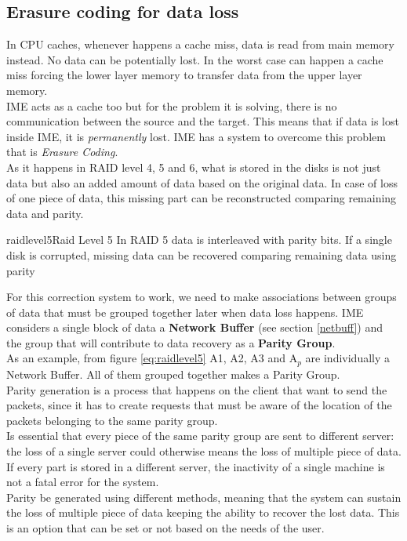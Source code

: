 \subsection{Erasure coding for data loss} \label{pargroup}
In CPU caches, whenever happens a cache miss, data is read from main memory
instead. No data can be potentially lost. In the worst case can happen a cache
miss forcing the lower layer memory to transfer data from the upper layer
memory. \\
IME acts as a cache too but for the problem it is solving, there is no
communication between the source and the target. This means that if data
is lost inside IME, it is \textit{permanently} lost. IME has a system to
overcome this problem that is \textit{Erasure Coding}. \\
As it happens in RAID level 4, 5 and 6, what is stored in the disks is not just
data but also an added amount of data based on the original data. In case of
loss of one piece of data, this missing part can be reconstructed comparing
remaining data and parity. \\
\begin{myimage}{raidlevel5}{Raid Level 5}
    In RAID 5 data is interleaved with parity bits. If a single disk is
    corrupted, missing data can be recovered comparing remaining data using
    parity
\end{myimage}
For this correction system to work, we need to make associations between groups
of data that must be grouped together later when data loss happens. IME
considers a single block of data a \textbf{Network Buffer} (see section \ref{netbuff}) and the
group that will contribute to data recovery as a \textbf{Parity Group}. \\
As an example, from figure \ref{eq:raidlevel5} A1, A2, A3 and A$_p$ are individually a Network
Buffer. All of them grouped together makes a Parity Group. \\
Parity generation is a process that happens on the client that want to send the
packets, since it has to create requests that must be aware of the location of
the packets belonging to the same parity group. \\
Is essential that every piece of the same parity group are sent to
different server: the loss of a single server could otherwise means the loss of
multiple piece of data. If every part is stored in a different server, the
inactivity of a single machine is not a fatal error for the system. \\
Parity be generated using different methods, meaning that the system can sustain
the loss of multiple piece of data keeping the ability to recover the lost data.
This is an option that can be set or not based on the needs of the user.

